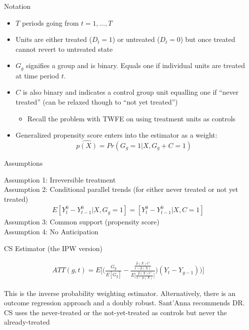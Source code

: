 \documentclass{beamer}
\begin{document}
\begin{frame}{Notation}

\begin{itemize}
\item $T$ periods going from $t=1, \dots, T$
\item Units are either treated ($D_t=1$) or untreated ($D_t=0$) but once treated cannot revert to untreated state
\item $G_g$ signifies a group and is binary.  Equals one if individual units are treated at time period $t$.
\item $C$ is also binary and indicates a control group unit equalling one if ``never treated'' (can be relaxed though to ``not yet treated'')
	\begin{itemize}
	\item Recall the problem with TWFE on using treatment units as controls
	\end{itemize}
\item Generalized propensity score enters into the estimator as a weight: $$\widehat{p(X)} = Pr(G_g=1 | X,G_g+C=1)$$
\end{itemize}

\end{frame}

\begin{frame}{Assumptions}

Assumption 1: Irreversible treatment \\
Assumption 2: Conditional parallel trends (for either never treated or not yet treated) \\
\begin{eqnarray*}
E[Y_t^0 - Y_{t-1}^0 | X,G_g=1] = [Y_t^0 - Y_{t-1}^0 | X,C=1] 
\end{eqnarray*}
\bigskip
Assumption 3: Common support (propensity score) \\
\bigskip
Assumption 4: No Anticipation

\end{frame}

\begin{frame}{CS Estimator (the IPW version)}

\begin{eqnarray*}
ATT(g,t) = E \bigg [ \bigg ( \frac{G_g}{E[G_g]} - \frac{ \frac{\hat{p}(X)C}{1-\hat{p}(X)}}{E \bigg [ \frac{\hat{p}(X)C}{1-\hat{p}(X)} \bigg ]} \bigg ) (Y_t - Y_{g-1} ) \bigg ) \bigg ]
\end{eqnarray*}

This is the inverse probability weighting estimator.  Alternatively, there is an outcome regression approach and a doubly robust. Sant'Anna recommends DR.  CS uses the never-treated or the not-yet-treated as controls but never the already-treated 
\end{frame}
\end{document}
